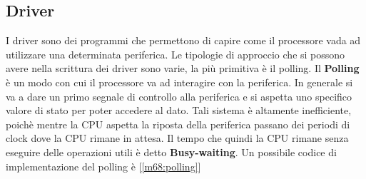 \subsection{Driver}
I driver sono dei programmi che permettono di capire come il processore vada ad utilizzare una determinata periferica.
Le tipologie di approccio che si possono avere nella scrittura dei driver sono varie, la più primitiva è il polling.
Il \textbf{Polling} è un modo con cui il processore va ad interagire con la periferica. In generale si va a dare un primo segnale di controllo alla periferica e si aspetta uno specifico valore di stato per poter accedere al dato. Tali sistema è altamente inefficiente, poichè mentre la CPU aspetta la riposta della periferica passano dei periodi di clock dove la CPU rimane in attesa. Il tempo che quindi la CPU rimane senza eseguire delle operazioni utili è detto \textbf{Busy-waiting}. Un possibile codice di implementazione del polling è [\ref{m68:polling}]

